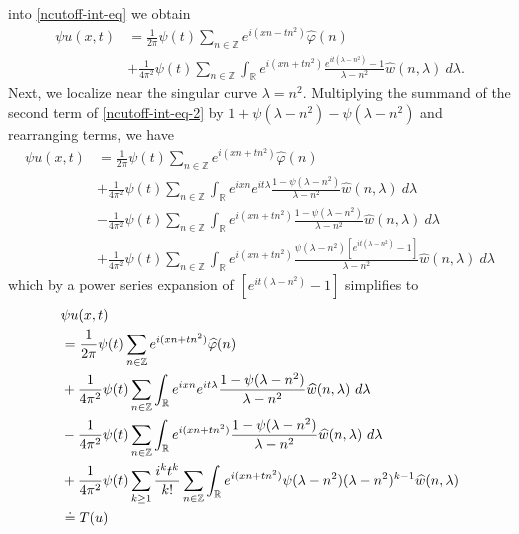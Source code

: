 \documentclass[12pt,reqno]{amsart}
\numberwithin{equation}{section}  %
\newcommand{\rr}{\mathbb{R}}
\newcommand{\zz}{\mathbb{Z}}
\newcommand{\wh}{\widehat}
\newcommand{\vp}{\varphi}
\begin{document}
into \eqref{ncutoff-int-eq} we obtain
%
%
\begin{equation}
	\begin{split}
		\label{ncutoff-int-eq-2}
    \psi u(x, t)
		& = \frac{1}{2 \pi} \psi(t) \sum_{n \in \zz} e^{i(xn - tn^{2})} \widehat{\vp}(n) 
		\\
		& + \frac{1}{4 \pi^2} \psi(t) \sum_{n \in \zz} \int_\rr
		e^{i(xn + t n^2)} \frac{e^{it(\lambda - n^2)}- 1}{\lambda - n^2} 
		\wh{w}(n, \lambda) \ d \lambda.
	\end{split}
\end{equation}
%
%
%
Next, we localize near the singular curve $\lambda =  n^2$.  Multiplying the
summand of the second term of \eqref{ncutoff-int-eq-2} by $1 + \psi(\lambda -
n^2) - \psi(\lambda -
n^2) $ and
rearranging terms, we have
%
%
\begin{equation*}
	\begin{split}
    \psi u(x, t)
		& = \frac{1}{2 \pi} \psi(t) \sum_{n \in \zz} e^{i(xn + t n^{2 
		})} \widehat{\vp}(n) 
		\\
		& + \frac{1}{4 \pi^2} \psi(t) \sum_{n \in \zz} \int_\rr e^{ixn}  
		e^{it \lambda} \frac{ 1 - \psi(\lambda - n^2) 
		}{\lambda - n^2} \wh{w}(n, \lambda) \ d \lambda
		\\
		& - \frac{1}{4 \pi^2} \psi(t) \sum_{n \in \zz} \int _\rr e^{i(xn + 
		t n^2)}
		 \frac{1- \psi(\lambda - n^2)}{\lambda - n^2} \wh{w}(n, \lambda) \ d \lambda
		\\
		& + \frac{1}{4 \pi^2} \psi(t) \sum_{n \in \zz} \int_\rr
		e^{i(xn + t n^2)}
		\frac{\psi(\lambda - n^2)\left[ e^{it(\lambda - n^2)}-1 
		\right]}{\lambda - n^2} \wh{w}(n, \lambda) \ d \lambda
	\end{split}
\end{equation*}
%
%
which by a power series expansion of $[e^{it(\lambda - n^2)}-1]$ simplifies  
to
%
%
\begin{align}
	\label{nmain-int-expression-0}
  & \psi u(x, t) 
		\\
		\label{nmain-int-expression-1}
		& = \frac{1}{2 \pi} \psi(t) \sum_{n \in \zz} e^{i(xn + tn^{2 
		})} \widehat{\vp}(n) 
		\\
		\label{nmain-int-expression-2}
		& + \frac{1}{4 \pi^2} \psi(t) \sum_{n\in \zz} \int_\rr e^{ixn}  
		e^{it \lambda} \frac{ 1 - \psi(\lambda -  n^2) 
		}{\lambda -  n^2} \wh{w}(n, \lambda) \ d \lambda
		\\
		\label{nmain-int-expression-3}
		& - \frac{1}{4 \pi^2} \psi(t) \sum_{n\in \zz} \int_\rr e^{i(xn + 
		t n^2)}
		 \frac{1- \psi(\lambda -  n^2)}{\lambda -  n^2} \wh{w}(n, \lambda) \ d \lambda
		\\
		\label{nmain-int-expression-4}
		& + \frac{1}{4 \pi^2} \psi(t) \sum_{k \ge 1} \frac{i^k t^k}{k!}
		\sum_{n \in \zz} \int_\rr e^{i(xn + t n^2 )}
		\psi(\lambda -  n^2) (\lambda -  n^2)^{k-1} \wh{w}(n, \lambda)  
		\\
		& \doteq T(u) \notag
\end{align}
\end{document}
